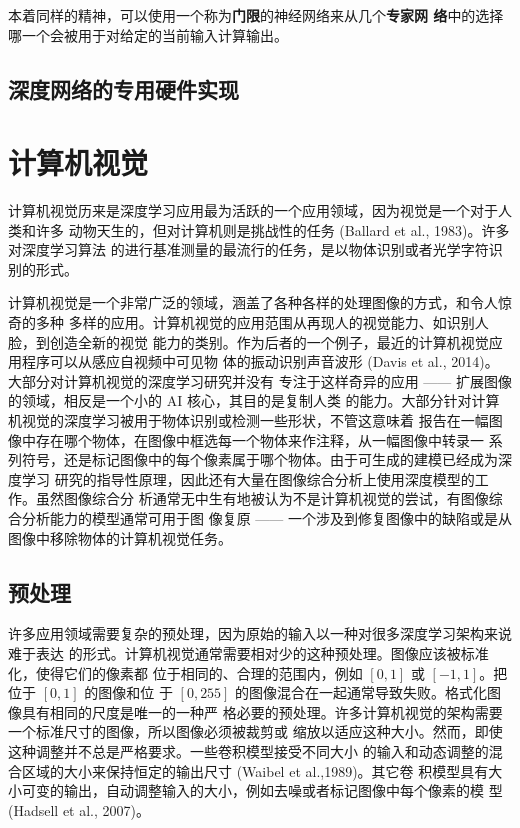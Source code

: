 本着同样的精神，可以使用一个称为\textbf{门限}的神经网络来从几个\textbf{专家网
  络}中的选择哪一个会被用于对给定的当前输入计算输出。

\subsection{深度网络的专用硬件实现}
\label{subsec:specialized_hardware_implementations_of_deep_networks}

\section{计算机视觉}
\label{sec:computer_vision}

计算机视觉历来是深度学习应用最为活跃的一个应用领域，因为视觉是一个对于人类和许多
动物天生的，但对计算机则是挑战性的任务 (Ballard et al., 1983)。许多对深度学习算法
的进行基准测量的最流行的任务，是以物体识别或者光学字符识别的形式。

计算机视觉是一个非常广泛的领域，涵盖了各种各样的处理图像的方式，和令人惊奇的多种
多样的应用。计算机视觉的应用范围从再现人的视觉能力、如识别人脸，到创造全新的视觉
能力的类别。作为后者的一个例子，最近的计算机视觉应用程序可以从感应自视频中可见物
体的振动识别声音波形 (Davis et al., 2014)。大部分对计算机视觉的深度学习研究并没有
专注于这样奇异的应用 —— 扩展图像的领域，相反是一个小的 AI 核心，其目的是复制人类
的能力。大部分针对计算机视觉的深度学习被用于物体识别或检测一些形状，不管这意味着
报告在一幅图像中存在哪个物体，在图像中框选每一个物体来作注释，从一幅图像中转录一
系列符号，还是标记图像中的每个像素属于哪个物体。由于可生成的建模已经成为深度学习
研究的指导性原理，因此还有大量在图像综合分析上使用深度模型的工作。虽然图像综合分
析通常无中生有地被认为不是计算机视觉的尝试，有图像综合分析能力的模型通常可用于图
像复原 —— 一个涉及到修复图像中的缺陷或是从图像中移除物体的计算机视觉任务。

\subsection{预处理}
\label{subsec:preprocessing}

许多应用领域需要复杂的预处理，因为原始的输入以一种对很多深度学习架构来说难于表达
的形式。计算机视觉通常需要相对少的这种预处理。图像应该被标准化，使得它们的像素都
位于相同的、合理的范围内，例如 $[0,1]$ 或 $[-1,1]$。把位于 $[0,1]$ 的图像和位
于 $[0,255]$ 的图像混合在一起通常导致失败。格式化图像具有相同的尺度是唯一的一种严
格必要的预处理。许多计算机视觉的架构需要一个标准尺寸的图像，所以图像必须被裁剪或
缩放以适应这种大小。然而，即使这种调整并不总是严格要求。一些卷积模型接受不同大小
的输入和动态调整的混合区域的大小来保持恒定的输出尺寸 (Waibel et al.,1989)。其它卷
积模型具有大小可变的输出，自动调整输入的大小，例如去噪或者标记图像中每个像素的模
型 (Hadsell et al., 2007)。

